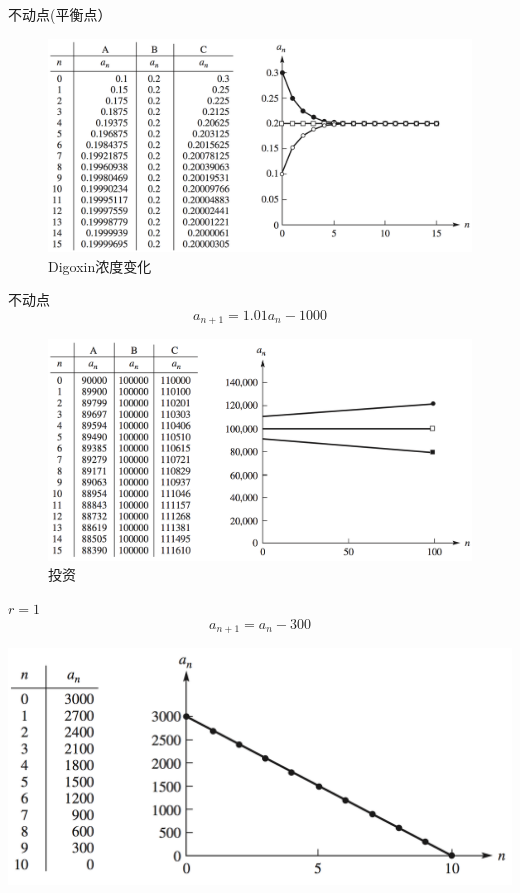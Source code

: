 \documentclass[
  ignorenonframetext,
]{ctexbeamer}
\begin{document}
\begin{frame}{不动点(平衡点）}
\label{ux4e0dux52a8ux70b9ux5e73ux8861ux70b9}
\begin{figure}[H]

{\centering \includegraphics{fixedpoint.png}

}

\caption{Digoxin浓度变化}

\end{figure}%
\end{frame}

\begin{frame}{不动点}
\label{ux4e0dux52a8ux70b9}
\[a_{n+1} = 1.01a_n -1000\]

\begin{figure}[H]

{\centering \includegraphics{invest.png}

}

\caption{投资}

\end{figure}%
\end{frame}

\begin{frame}{\(r = 1\)}
\label{r-1}
\[a_{n+1} = a_n -300\]

\includegraphics{poor.png}
\end{frame}
\end{document}
